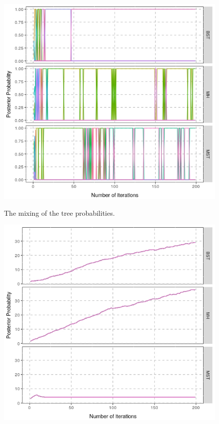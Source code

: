 \documentclass[a1paper,portrait, fontscale=0.45]{baposter}
\begin{document}
\begin{poster}
{\begin{multicols}{3}
\begin{figure}[H]
\begin{minipage}[c]{0.6\linewidth}
\includegraphics[width=\linewidth]{comp3postmix.jpeg}
\label{fig:comppost}
\vspace{-1.7em}
\caption{The mixing of the tree probabilities.}
\end{minipage}
\end{figure}
\begin{figure}[H]
\hspace{1em}
\begin{minipage}[c]{0.6\linewidth}
\includegraphics[width=\linewidth]{comp3treesize.jpeg}

\end{minipage}
\end{figure}
\end{multicols}}
\end{poster}
\end{document}
